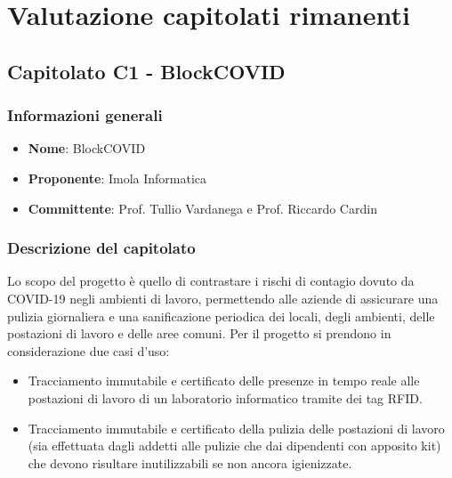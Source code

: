 \section{Valutazione capitolati rimanenti}

	\subsection{Capitolato C1 - BlockCOVID}
		\subsubsection{Informazioni generali}
			\begin{itemize}
				\item\textbf{Nome}: BlockCOVID
				\item\textbf{Proponente}: Imola Informatica
				\item\textbf{Committente}: Prof. Tullio Vardanega e Prof. Riccardo Cardin
			\end{itemize}
			
		\subsubsection{Descrizione del capitolato}
			Lo scopo del progetto è quello di contrastare i rischi di contagio dovuto da COVID-19 negli ambienti di lavoro, permettendo alle aziende di assicurare una pulizia giornaliera e una sanificazione periodica dei locali, degli ambienti, delle postazioni di lavoro e delle aree comuni.
			Per il progetto si prendono in considerazione due casi d’uso:
			\begin{itemize}
				\item Tracciamento immutabile e certificato delle presenze in tempo reale alle postazioni di lavoro di un laboratorio informatico tramite dei tag RFID.
				\item Tracciamento immutabile e certificato della pulizia delle postazioni di lavoro (sia effettuata dagli addetti alle pulizie che dai dipendenti con apposito kit) che devono risultare inutilizzabili se non ancora igienizzate.
			\end{itemize}
